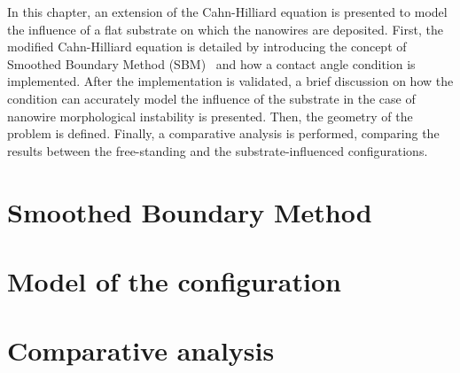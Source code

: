 In this chapter, an extension of the Cahn-Hilliard equation is presented to model the influence of a flat substrate on which the nanowires are deposited. First, the modified Cahn-Hilliard equation is detailed by introducing the concept of Smoothed Boundary Method (SBM) \cite{YuChenThornton2009, YuChenThornton2012, YangWangKim2022, LiChoiKim2016} and how a contact angle condition is implemented. After the implementation is validated, a brief discussion on how the condition can accurately model the influence of the substrate in the case of nanowire morphological instability is presented. Then, the geometry of the problem is defined. Finally, a comparative analysis is performed, comparing the results between the free-standing and the substrate-influenced configurations. 
\section{Smoothed Boundary Method}
    

\section{Model of the configuration}
    
     
\section{Comparative analysis}
    
